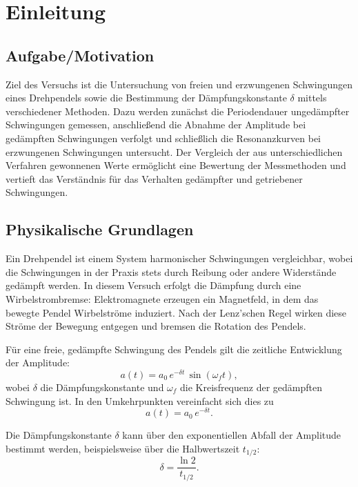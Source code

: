 \chapter{Einleitung}

\section{Aufgabe/Motivation}
Ziel des Versuchs ist die Untersuchung von freien und erzwungenen Schwingungen eines Drehpendels sowie die Bestimmung der Dämpfungskonstante $\delta$ mittels verschiedener Methoden. Dazu werden zunächst die Periodendauer ungedämpfter Schwingungen gemessen, anschließend die Abnahme der Amplitude bei gedämpften Schwingungen verfolgt und schließlich die Resonanzkurven bei erzwungenen Schwingungen untersucht. Der Vergleich der aus unterschiedlichen Verfahren gewonnenen Werte ermöglicht eine Bewertung der Messmethoden und vertieft das Verständnis für das Verhalten gedämpfter und getriebener Schwingungen.

\section{Physikalische Grundlagen}
Ein Drehpendel ist einem System harmonischer Schwingungen vergleichbar, wobei die Schwingungen in der Praxis stets durch Reibung oder andere Widerstände gedämpft werden. In diesem Versuch erfolgt die Dämpfung durch eine Wirbelstrombremse: Elektromagnete erzeugen ein Magnetfeld, in dem das bewegte Pendel Wirbelströme induziert. Nach der Lenz’schen Regel wirken diese Ströme der Bewegung entgegen und bremsen die Rotation des Pendels.  

Für eine freie, gedämpfte Schwingung des Pendels gilt die zeitliche Entwicklung der Amplitude:
\begin{equation}
a(t) = a_0 \, e^{-\delta t} \, \sin(\omega_f t),
\end{equation}
wobei $\delta$ die Dämpfungskonstante und $\omega_f$ die Kreisfrequenz der gedämpften Schwingung ist. In den Umkehrpunkten vereinfacht sich dies zu
\begin{equation}
a(t) = a_0 \, e^{-\delta t}.
\end{equation}

Die Dämpfungskonstante $\delta$ kann über den exponentiellen Abfall der Amplitude bestimmt werden, beispielsweise über die Halbwertszeit $t_{1/2}$:
\begin{equation}
\delta = \frac{\ln 2}{t_{1/2}}.
\end{equation}

